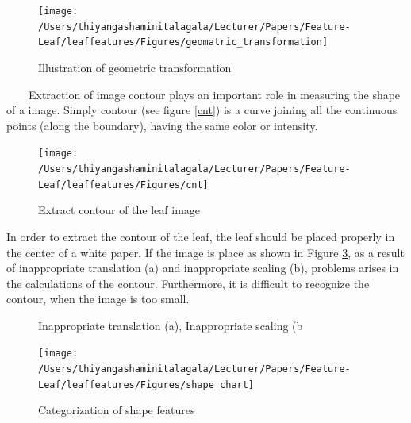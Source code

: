 \documentclass{article}
\begin{document}
\begin{figure}[!ht]

{\centering \texttt{[image: /Users/thiyangashaminitalagala/Lecturer/Papers/Feature-Leaf/leaffeatures/Figures/geomatric\_transformation]} 

}

\caption{\label{img3} Illustration of geometric transformation}\label{fig:unnamed-chunk-11}
\end{figure}

~~~~Extraction of image contour plays an important role in measuring the
shape of a image. Simply contour (see figure \ref{cnt}) is a curve
joining all the continuous points (along the boundary), having the same
color or intensity.

\begin{figure}[!ht]

{\centering \texttt{[image: /Users/thiyangashaminitalagala/Lecturer/Papers/Feature-Leaf/leaffeatures/Figures/cnt]} 

}

\caption{\label{cnt}Extract contour of the leaf image}\label{fig:unnamed-chunk-12}
\end{figure}

In order to extract the contour of the leaf, the leaf should be placed
properly in the center of a white paper. If the image is place as shown
in Figure \ref{fig:trans}, as a result of inappropriate translation (a)
and inappropriate scaling (b), problems arises in the calculations of
the contour. Furthermore, it is difficult to recognize the contour, when
the image is too small.

\begin{figure}[!ht]

{\centering {}

}

\caption{\label{trans}Inappropriate translation (a),  Inappropriate scaling (b}\label{fig:trans}
\end{figure}

\begin{figure}[!ht]

{\centering \texttt{[image: /Users/thiyangashaminitalagala/Lecturer/Papers/Feature-Leaf/leaffeatures/Figures/shape\_chart]} 

}

\caption{\label{scalimg4}Categorization of shape features}\label{fig:unnamed-chunk-13}
\end{figure}
\end{document}

